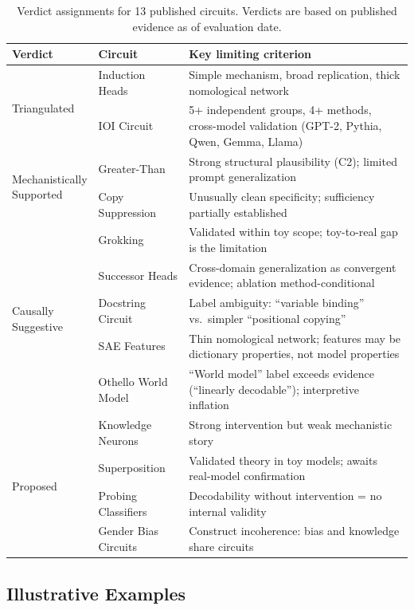 \documentclass[10pt]{article}
\newcommand{\tighttable}{\setlength{\tabcolsep}{4pt}\renewcommand{\arraystretch}{1.05}}
\begin{document}
\begin{table}[t]
\centering
\tighttable
\caption{Verdict assignments for 13 published circuits. Verdicts are based on published evidence as of evaluation date.}
\label{tab:case-studies}
\small
\begin{tabular}{@{}llp{6.5cm}@{}}
\toprule
\textbf{Verdict} & \textbf{Circuit} & \textbf{Key limiting criterion} \\
\midrule
\multirow{2}{*}{Triangulated} & Induction Heads & Simple mechanism, broad replication, thick nomological network \\
& IOI Circuit & 5+ independent groups, 4+ methods, cross-model validation (GPT-2, Pythia, Qwen, Gemma, Llama) \\
\midrule
\multirow{2}{*}{\parbox{2.3cm}{Mechanistically\\Supported}} & Greater-Than & Strong structural plausibility (C2); limited prompt generalization \\
& Copy Suppression & Unusually clean specificity; sufficiency partially established \\
\midrule
\multirow{5}{*}{\parbox{2.3cm}{Causally\\Suggestive}} & Grokking & Validated within toy scope; toy-to-real gap is the limitation \\
& Successor Heads & Cross-domain generalization as convergent evidence; ablation method-conditional \\
& Docstring Circuit & Label ambiguity: ``variable binding'' vs.\ simpler ``positional copying'' \\
& SAE Features & Thin nomological network; features may be dictionary properties, not model properties \\
& Othello World Model & ``World model'' label exceeds evidence (``linearly decodable''); interpretive inflation \\
\midrule
\multirow{4}{*}{Proposed} & Knowledge Neurons & Strong intervention but weak mechanistic story \\
& Superposition & Validated theory in toy models; awaits real-model confirmation \\
& Probing Classifiers & Decodability without intervention = no internal validity \\
& Gender Bias Circuits & Construct incoherence: bias and knowledge share circuits \\
\bottomrule
\end{tabular}
\end{table}

\subsection{Illustrative Examples}
\end{document}
